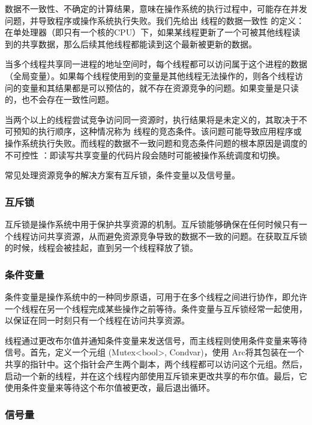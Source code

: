 数据不一致性、不确定的计算结果，意味在操作系统的执行过程中，可能存在并发问题，并导致程序或操作系统执行失败。我们先给出 线程的数据一致性 的定义：在单处理器（即只有一个核的CPU）下，如果某线程更新了一个可被其他线程读到的共享数据，那么后续其他线程都能读到这个最新被更新的数据。

当多个线程共享同一进程的地址空间时，每个线程都可以访问属于这个进程的数据（全局变量）。如果每个线程使用到的变量是其他线程无法操作的，则各个线程访问的变量和其结果都是可以预估的，就不存在资源竞争的问题。如果变量是只读的，也不会存在一致性问题。

当两个以上的线程尝试竞争访问同一资源时，执行结果将是未定义的，其取决于不可预知的执行顺序，这种情况称为 线程的竞态条件。该问题可能导致应用程序或操作系统执行失败。而线程的数据不一致问题和竞态条件问题的根本原因是调度的不可控性 ：即读写共享变量的代码片段会随时可能被操作系统调度和切换。

常见处理资源竞争的解决方案有互斥锁，条件变量以及信号量。

\subsubsection{互斥锁}

互斥锁是操作系统中用于保护共享资源的机制。互斥锁能够确保在任何时候只有一个线程访问共享资源，从而避免资源竞争导致的数据不一致的问题。在获取互斥锁的时候，线程会被挂起，直到另一个线程释放了锁。

\subsubsection{条件变量}

条件变量是操作系统中的一种同步原语，可用于在多个线程之间进行协作，即允许一个线程在另一个线程完成某些操作之前等待。条件变量与互斥锁经常一起使用，以保证在同一时刻只有一个线程在访问共享资源。

线程通过更改布尔值并通知条件变量来发送信号，而主线程则使用条件变量来等待信号。首先，定义一个元组 (Mutex<bool>, Condvar)，使用 Arc将其包装在一个共享的指针中。这个指针会产生两个副本，两个线程都可以访问这个元组。然后，启动一个新的线程，并在这个线程内部使用互斥锁来更改共享的布尔值。最后，它使用条件变量来等待这个布尔值被更改，最后退出循环。

\subsubsection{信号量}

